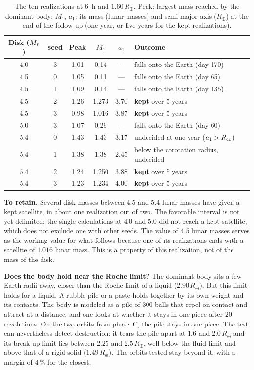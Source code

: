 \documentclass[11pt,a4paper]{article}
\newcommand{\Rt}{\ensuremath{R_\oplus}}
\newcommand{\ML}{\ensuremath{M_L}}
\begin{document}
\begin{table}[htbp]
\centering
\caption{The ten realizations at $6$~h and $1.60\,\Rt$. Peak: largest mass reached by the dominant body; $M_1$, $a_1$: its mass (lunar masses) and semi-major axis ($\Rt$) at the end of the follow-up (one year, or five years for the kept realizations).\label{tab:M45}}
\small
\begin{tabular}{ccccc>{\raggedright\arraybackslash}p{6.0cm}}
\toprule
Disk ($\ML$) & seed & Peak & $M_1$ & $a_1$ & Outcome \\
\midrule
4.0 & 3 & 1.01 & 0.14 & --- & falls onto the Earth (day 170) \\
4.5 & 0 & 1.05 & 0.11 & --- & falls onto the Earth (day 65) \\
4.5 & 1 & 1.09 & 0.14 & --- & falls onto the Earth (day 135) \\
4.5 & 2 & 1.26 & 1.273 & 3.70 & \textbf{kept} over 5 years \\
4.5 & 3 & 0.98 & 1.016 & 3.87 & \textbf{kept} over 5 years \\
5.0 & 3 & 1.07 & 0.29 & --- & falls onto the Earth (day 60) \\
5.4 & 0 & 1.43 & 1.43 & 3.17 & undecided at one year ($a_1>R_{\rm co}$) \\
5.4 & 1 & 1.38 & 1.38 & 2.45 & below the corotation radius, undecided \\
5.4 & 2 & 1.24 & 1.250 & 3.88 & \textbf{kept} over 5 years \\
5.4 & 3 & 1.23 & 1.234 & 4.00 & \textbf{kept} over 5 years \\
\bottomrule
\end{tabular}
\end{table}

\textbf{To retain.} Several disk masses between $4.5$ and $5.4$ lunar masses have given a kept satellite, in about one realization out of two. The favorable interval is not yet delimited: the single calculations at $4.0$ and $5.0$ did not reach a kept satellite, which does not exclude one with other seeds. The value of $4.5$ lunar masses serves as the working value for what follows because one of its realizations ends with a satellite of $1.016$ lunar mass. This is a property of this realization, not of the mass of the disk.

\textbf{Does the body hold near the Roche limit?} The dominant body sits a few Earth radii away, closer than the Roche limit of a liquid ($2.90\,\Rt$). But this limit holds for a liquid. A rubble pile or a paste holds together by its own weight and its contacts. The body is modeled as a pile of $300$ balls that repel on contact and attract at a distance, and one looks at whether it stays in one piece after $20$ revolutions. On the two orbits from phase~C, the pile stays in one piece. The test can nevertheless detect destruction: it tears the pile apart at $1.6$ and $2.0\,\Rt$ and its break-up limit lies between $2.25$ and $2.5\,\Rt$, well below the fluid limit and above that of a rigid solid ($1.49\,\Rt$). The orbits tested stay beyond it, with a margin of $4\,\%$ for the closest.
\end{document}

